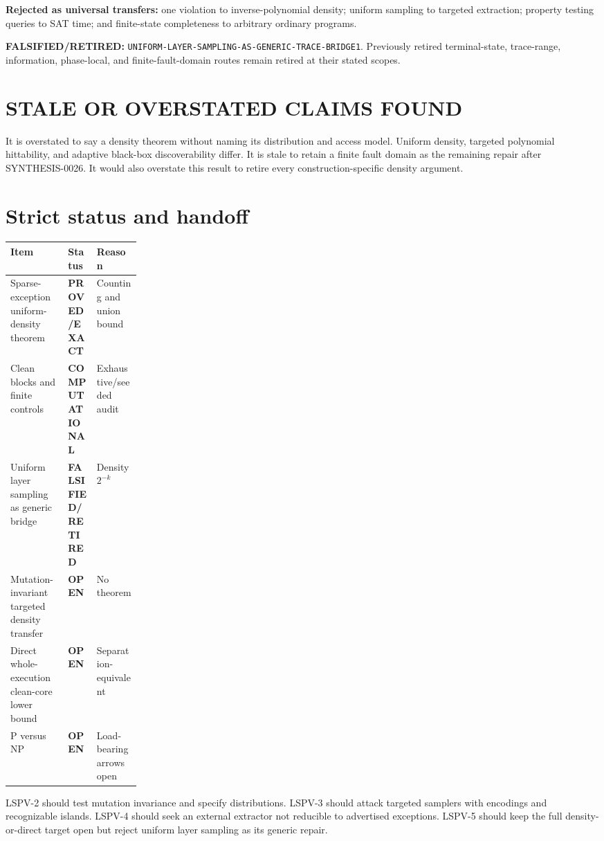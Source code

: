 \documentclass[11pt]{article}
\newcommand{\EXACT}{\textbf{PROVED/EXACT}}
\newcommand{\COMP}{\textbf{COMPUTATIONAL}}
\newcommand{\OPEN}{\textbf{OPEN}}
\newcommand{\RET}{\textbf{FALSIFIED/RETIRED}}
\begin{document}
\textbf{Rejected as universal transfers:} one violation to
inverse-polynomial density; uniform sampling to targeted extraction; property
testing queries to SAT time; and finite-state completeness to arbitrary
ordinary programs.

\textbf{FALSIFIED/RETIRED:}
\texttt{UNIFORM-LAYER-SAMPLING-AS-GENERIC-TRACE-BRIDGE1}. Previously retired
terminal-state, trace-range, information, phase-local, and finite-fault-domain
routes remain retired at their stated scopes.

\section{STALE OR OVERSTATED CLAIMS FOUND}
It is overstated to say a density theorem without naming its distribution and
access model. Uniform density, targeted polynomial hittability, and adaptive
black-box discoverability differ. It is stale to retain a finite fault domain
as the remaining repair after SYNTHESIS-0026. It would also overstate this
result to retire every construction-specific density argument.

\section{Strict status and handoff}
\begin{center}
\begin{tabularx}{0.98\linewidth}{Xp{0.22\linewidth}X}
\toprule Item & Status & Reason\\ \midrule
Sparse-exception uniform-density theorem & \EXACT & Counting and union bound\\
Clean blocks and finite controls & \COMP & Exhaustive/seeded audit\\
Uniform layer sampling as generic bridge & \RET & Density \(2^{-k}\)\\
Mutation-invariant targeted density transfer & \OPEN & No theorem\\
Direct whole-execution clean-core lower bound & \OPEN & Separation-equivalent\\
P versus NP & \OPEN & Load-bearing arrows open\\ \bottomrule
\end{tabularx}
\end{center}

LSPV-2 should test mutation invariance and specify distributions. LSPV-3
should attack targeted samplers with encodings and recognizable islands.
LSPV-4 should seek an external extractor not reducible to advertised
exceptions. LSPV-5 should keep the full density-or-direct target open but
reject uniform layer sampling as its generic repair.
\end{document}
